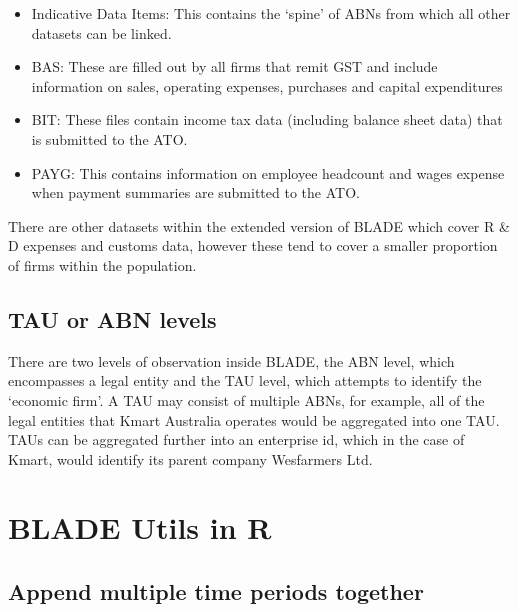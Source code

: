 \documentclass[
]{book}
\providecommand{\tightlist}{%
  \setlength{\itemsep}{0pt}\setlength{\parskip}{0pt}}
\begin{document}
\begin{itemize}
\tightlist
\item
  Indicative Data Items: This contains the `spine' of ABNs from which all other datasets can be linked.
\item
  BAS: These are filled out by all firms that remit GST and include information on sales, operating expenses, purchases and capital expenditures
\item
  BIT: These files contain income tax data (including balance sheet data) that is submitted to the ATO.
\item
  PAYG: This contains information on employee headcount and wages expense when payment summaries are submitted to the ATO.
\end{itemize}

There are other datasets within the extended version of BLADE which cover R \& D expenses and customs data, however these tend to cover a smaller proportion of firms within the population.

\hypertarget{tau-or-abn-levels}{%
\subsection{TAU or ABN levels}\label{tau-or-abn-levels}}

There are two levels of observation inside BLADE, the ABN level, which encompasses a legal entity and the TAU level, which attempts to identify the `economic firm'. A TAU may consist of multiple ABNs, for example, all of the legal entities that Kmart Australia operates would be aggregated into one TAU. TAUs can be aggregated further into an enterprise id, which in the case of Kmart, would identify its parent company Wesfarmers Ltd.~

\hypertarget{blade-utils-in-r}{%
\section{BLADE Utils in R}\label{blade-utils-in-r}}

\hypertarget{append-multiple-time-periods-together}{%
\subsection{Append multiple time periods together}\label{append-multiple-time-periods-together}}
\end{document}
